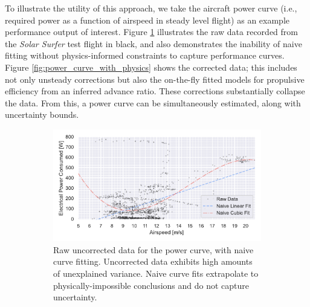\documentclass[12pt,vi,oneside,table]{report}
\begin{document}
    To illustrate the utility of this approach, we take the aircraft power curve (i.e., required power as a function of airspeed in steady level flight) as an example performance output of interest. Figure \ref{fig:power_curve_naive} illustrates the raw data recorded from the \textit{Solar Surfer} test flight in black, and also demonstrates the inability of naive fitting without physics-informed constraints to capture performance curves. Figure \ref{fig:power_curve_with_physics} shows the corrected data; this includes not only unsteady corrections but also the on-the-fly fitted models for propulsive efficiency from an inferred advance ratio. These corrections substantially collapse the data. From this, a power curve can be simultaneously estimated, along with uncertainty bounds.

    \begin{figure}[htbp!]
        \centering
        \begin{subfigure}[b]{0.8\textwidth}
            \centering
            \includegraphics[width=\textwidth]{../figures/aircraft_polar_reconstruction/figures/power_polar_naive}
            \caption{Raw uncorrected data for the power curve, with naive curve fitting. Uncorrected data exhibits high amounts of unexplained variance. Naive curve fits extrapolate to physically-impossible conclusions and do not capture uncertainty.}
            \label{fig:power_curve_naive}
        \end{subfigure}
        \begin{subfigure}[b]{0.8\textwidth}
            \centering

\end{subfigure}
\end{figure}
\end{document}
